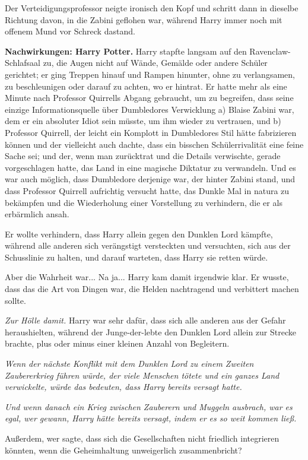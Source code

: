 Der Verteidigungsprofessor neigte ironisch den Kopf und schritt dann in dieselbe
Richtung davon, in die Zabini geflohen war, während Harry immer noch mit offenem
Mund vor Schreck dastand.

\textbf{Nachwirkungen: Harry Potter.}
Harry stapfte langsam auf den Ravenclaw-Schlafsaal zu, die Augen nicht auf
Wände, Gemälde oder andere Schüler gerichtet; er ging Treppen hinauf und Rampen
hinunter, ohne zu verlangsamen, zu beschleunigen oder darauf zu achten, wo er
hintrat. Er hatte mehr als eine Minute nach Professor Quirrells Abgang
gebraucht, um zu begreifen, dass seine einzige Informationsquelle über
Dumbledores Verwicklung a) Blaise Zabini war, dem er ein absoluter Idiot sein
müsste, um ihm wieder zu vertrauen, und b) Professor Quirrell, der leicht ein
Komplott in Dumbledores Stil hätte fabrizieren können und der vielleicht auch
dachte, dass ein bisschen Schülerrivalität eine feine Sache sei; und der, wenn
man zurücktrat und die Details verwischte, gerade vorgeschlagen hatte, das Land
in eine magische Diktatur zu verwandeln. Und es war auch möglich, dass
Dumbledore derjenige war, der hinter Zabini stand, und dass Professor Quirrell
aufrichtig versucht hatte, das Dunkle Mal in natura zu bekämpfen und die
Wiederholung einer Vorstellung zu verhindern, die er als erbärmlich ansah.

Er wollte verhindern, dass Harry allein gegen den Dunklen Lord kämpfte, während
alle anderen sich verängstigt versteckten und versuchten, sich aus der
Schusslinie zu halten, und darauf warteten, dass Harry sie retten würde.

Aber die Wahrheit war... Na ja... Harry kam damit irgendwie klar. Er wusste,
dass das die Art von Dingen war, die Helden nachtragend und verbittert machen
sollte.

\emph{Zur Hölle damit. }Harry war sehr dafür, dass sich alle anderen aus der
Gefahr heraushielten, während der Junge-der-lebte den Dunklen Lord allein zur
Strecke brachte, plus oder minus einer kleinen Anzahl von Begleitern.

\emph{Wenn der nächste Konflikt mit dem Dunklen Lord zu einem Zweiten
Zaubererkrieg führen würde, der viele Menschen tötete und ein ganzes Land
verwickelte, würde das bedeuten, dass Harry bereits versagt hatte.}

\emph{Und wenn danach ein Krieg zwischen Zauberern und Muggeln ausbrach, war es
egal, wer gewann, Harry hätte bereits versagt, indem er es so weit kommen ließ.}

Außerdem, wer sagte, dass sich die Gesellschaften nicht friedlich integrieren
könnten, wenn die Geheimhaltung unweigerlich zusammenbricht?

